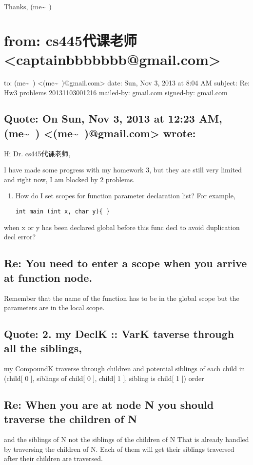 \documentclass[12pt]{book}
\begin{document}
Thanks,
(me\textasciitilde{}~)

\section{from:         cs445代课老师 <captainbbbbbbb@gmail.com>}
\label{sec-28-2}
to:         (me\textasciitilde{}~) <(me\textasciitilde{}~)@gmail.com>
date:         Sun, Nov 3, 2013 at 8:04 AM
subject:         Re: Hw3 problems  20131103001216
mailed-by:         gmail.com
signed-by:         gmail.com

\subsection{Quote: On Sun, Nov 3, 2013 at 12:23 AM, (me\textasciitilde{}~) <(me\textasciitilde{}~)@gmail.com> wrote:}
\label{sec-28-2-1}
Hi Dr. cs445代课老师, 

I have made some progress with my homework 3, but they are still very limited and right now, I am blocked by 2 problems. 

\begin{enumerate}
\item How do I set scopes for function parameter declaration list? For example, 
\lstset{language=java,label= ,caption= ,numbers=none}
\begin{lstlisting}
int main (int x, char y){ }
\end{lstlisting}
\end{enumerate}

when x or y has been declared global before this func decl to avoid duplication decl error?

\subsection{Re: You need to enter a scope when you arrive at function node.}
\label{sec-28-2-2}
Remember that the name of the function has to be in the global scope but the parameters are in the local scope.

\subsection{Quote: 2. my DeclK :: VarK taverse through all the siblings,}
\label{sec-28-2-3}
my CompoundK traverse through children and potential siblings of each child in (child[ 0 ], siblings of child[ 0 ], child[ 1 ], sibling is child[ 1 ]) order

\subsection{Re: When you are at node N you should traverse the children of N}
\label{sec-28-2-4}
and the siblings of N not the siblings of the children of N   That is already handled by traversing the children of N. Each of them will get their siblings traversed after their children are traversed.
\end{document}
